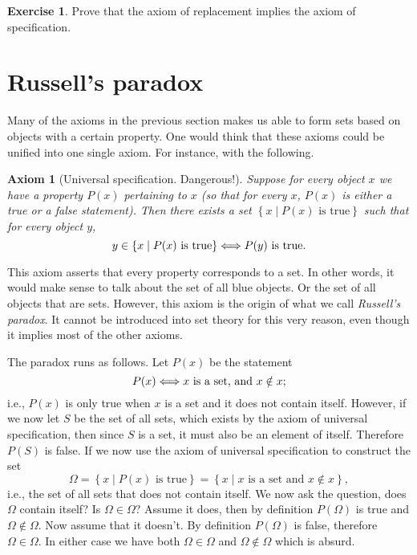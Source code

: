 \documentclass[a4paper, twocolumn]{report}
\newcounter{exercise} \numberwithin{exercise}{section}
\newcounter{axmcntr} \numberwithin{axmcntr}{chapter}
\newtheorem{axm}[axmcntr]{Axiom}
\theoremstyle{definition}
\newtheorem{exc}[exercise]{Exercise}
\theoremstyle{solution}
\begin{document}
\begin{exc}
  Prove that the axiom of replacement implies the axiom of specification. 
\end{exc}

\section{Russell's paradox}

Many of the axioms in the previous section makes us able to form sets based on
objects with a certain property.  One would think that these axioms could be
unified into one single axiom. For instance, with the following.

\begin{axm}[Universal specification. Dangerous!]
  \label{axm_38}
  Suppose for every object $x$ we have a property $P(x)$ pertaining to $x$ (so that for every $x$, $P(x)$ is either
  a true or a false statement). Then there exists a set $\left\{ x \mid P(x) \text{ is true} \right\}$ such that for every object $y$,
  \begin{equation}
    \notag
    y \in \left\{ x \mid P(x) \text{ is true} \right\} \Longleftrightarrow P(y) \text{ is true.}
  \end{equation}
\end{axm}

This axiom asserts that every property corresponds to a set. In other words, it
would make sense to talk about the set of all blue objects. Or the set of all
objects that are sets. However, this axiom is the origin of what we call
\textit{Russell's paradox}.  It cannot be introduced into set theory for this
very reason, even though it implies most of the other axioms.

The paradox runs as follows. Let $P(x)$ be the statement
\begin{equation}
  \notag
  P(x) \Longleftrightarrow x \text{ is a set, and } x \notin x;
\end{equation}
i.e., $P(x)$ is only true when $x$ is a set and it does not contain itself.
However, if we now let $S$ be the set of all sets, which exists by the axiom of
universal specification, then since $S$ is a set, it must also be an element of
itself. Therefore $P(S)$ is false. If we now use the axiom of universal
specification to construct the set
\begin{equation}
  \Omega = \left\{ x \mid P(x) \text{ is true} \right\} = \left\{ x \mid x \text{ is a set and } x \notin x \right\}, 
\end{equation}
i.e., the set of all sets that does not contain itself.  We now ask the
question, does $\Omega$ contain itself? Is $\Omega \in \Omega$?  Assume it
does, then by definition $P(\Omega)$ is true and $\Omega \notin \Omega$. Now
assume that it doesn't. By definition $P(\Omega)$ is false, therefore $\Omega
\in \Omega$. In either case we have both $\Omega \in \Omega$ and $\Omega \notin
\Omega$ which is absurd. 
\end{document}
